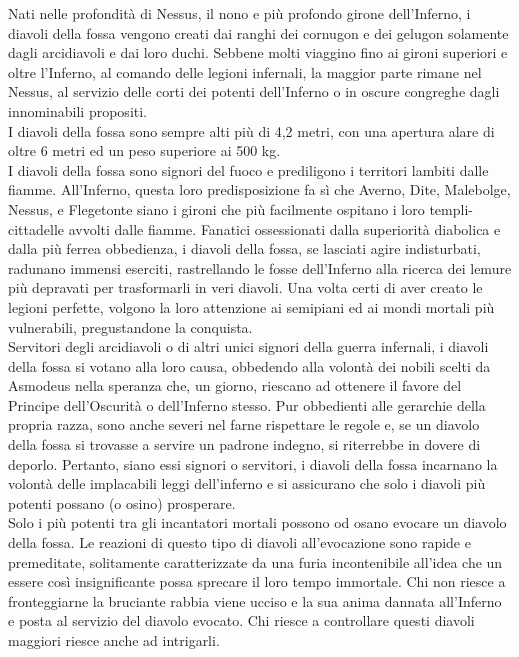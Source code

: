 \begin{multicols}{2}
Nati nelle profondità di Nessus, il nono e più profondo girone dell'Inferno, i diavoli della fossa vengono creati dai ranghi dei cornugon e dei gelugon solamente dagli arcidiavoli e dai loro duchi. Sebbene molti viaggino fino ai gironi superiori e oltre l'Inferno, al comando delle legioni infernali, la maggior parte rimane nel Nessus, al servizio delle corti dei potenti dell'Inferno o in oscure congreghe dagli innominabili propositi.\\

I diavoli della fossa sono sempre alti più di 4,2 metri, con una apertura alare di oltre 6 metri ed un peso superiore ai 500 kg.\\

I diavoli della fossa sono signori del fuoco e prediligono i territori lambiti dalle fiamme. All'Inferno, questa loro predisposizione fa sì che Averno, Dite, Malebolge, Nessus, e Flegetonte siano i gironi che più facilmente ospitano i loro templi-cittadelle avvolti dalle fiamme. Fanatici ossessionati dalla superiorità diabolica e dalla più ferrea obbedienza, i diavoli della fossa, se lasciati agire indisturbati, radunano immensi eserciti, rastrellando le fosse dell'Inferno alla ricerca dei lemure più depravati per trasformarli in veri diavoli. Una volta certi di aver creato le legioni perfette, volgono la loro attenzione ai semipiani ed ai mondi mortali più vulnerabili, pregustandone la conquista.\\

Servitori degli arcidiavoli o di altri unici signori della guerra infernali, i diavoli della fossa si votano alla loro causa, obbedendo alla volontà dei nobili scelti da Asmodeus nella speranza che, un giorno, riescano ad ottenere il favore del Principe dell'Oscurità o dell'Inferno stesso. Pur obbedienti alle gerarchie della propria razza, sono anche severi nel farne rispettare le regole e, se un diavolo della fossa si trovasse a servire un padrone indegno, si riterrebbe in dovere di deporlo. Pertanto, siano essi signori o servitori, i diavoli della fossa incarnano la volontà delle implacabili leggi dell'inferno e si assicurano che solo i diavoli più potenti possano (o osino) prosperare.\\

Solo i più potenti tra gli incantatori mortali possono od osano evocare un diavolo della fossa. Le reazioni di questo tipo di diavoli all'evocazione sono rapide e premeditate, solitamente caratterizzate da una furia incontenibile all'idea che un essere così insignificante possa sprecare il loro tempo immortale. Chi non riesce a fronteggiarne la bruciante rabbia viene ucciso e la sua anima dannata all'Inferno e posta al servizio del diavolo evocato. Chi riesce a controllare questi diavoli maggiori riesce anche ad intrigarli.\\


\end{multicols}
